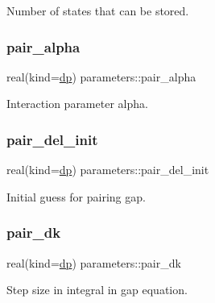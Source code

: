 Number of states that can be stored. 

\mbox{\label{group__INPUT__PARS_gaa3116e010e1f1435881ad489d7ea5dad}} 
\subsubsection{\texorpdfstring{pair\+\_\+alpha}{pair\_alpha}}
{\footnotesize\ttfamily real(kind=\mbox{\hyperlink{namespaceparameters_a52f8c6351fd79345d8811e065bcbbb37}{dp}}) parameters\+::pair\+\_\+alpha}



Interaction parameter alpha. 

\mbox{\label{group__INPUT__PARS_ga9fe26afec63d3ebfb7900ccc330779d0}} 
\subsubsection{\texorpdfstring{pair\+\_\+del\+\_\+init}{pair\_del\_init}}
{\footnotesize\ttfamily real(kind=\mbox{\hyperlink{namespaceparameters_a52f8c6351fd79345d8811e065bcbbb37}{dp}}) parameters\+::pair\+\_\+del\+\_\+init}



Initial guess for pairing gap. 

\mbox{\label{group__INPUT__PARS_ga1c083bc7a4e3979327020ec3e1509220}} 
\subsubsection{\texorpdfstring{pair\+\_\+dk}{pair\_dk}}
{\footnotesize\ttfamily real(kind=\mbox{\hyperlink{namespaceparameters_a52f8c6351fd79345d8811e065bcbbb37}{dp}}) parameters\+::pair\+\_\+dk}



Step size in integral in gap equation. 

\mbox{\label{group__INPUT__PARS_gacd8c346f8b069e0dca502d57557b21e7}} 
